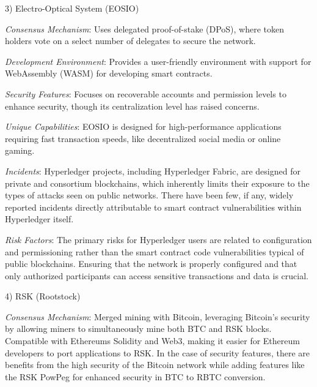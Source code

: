 \begin{multicols}{2}
3) Electro-Optical System (EOSIO)

\emph{Consensus Mechanism}: Uses delegated proof-of-stake (DPoS), where
token holders vote on a select number of delegates to secure the
network.

\emph{Development Environment}: Provides a user-friendly environment
with support for WebAssembly (WASM) for developing smart contracts.

\emph{Security Features}: Focuses on recoverable accounts and permission
levels to enhance security, though its centralization level has raised
concerns.

\emph{Unique Capabilities}: EOSIO is designed for high-performance
applications requiring fast transaction speeds, like decentralized
social media or online gaming.

\emph{Incidents}: Hyperledger projects, including Hyperledger Fabric,
are designed for private and consortium blockchains, which inherently
limits their exposure to the types of attacks seen on public networks.
There have been few, if any, widely reported incidents directly
attributable to smart contract vulnerabilities within Hyperledger
itself.

\emph{Risk Factors}: The primary risks for Hyperledger users are related
to configuration and permissioning rather than the smart contract code
vulnerabilities typical of public blockchains. Ensuring that the network
is properly configured and that only authorized participants can access
sensitive transactions and data is crucial.

4) RSK (Rootstock)

\emph{Consensus Mechanism}: Merged mining with Bitcoin, leveraging
Bitcoin's security by allowing miners to simultaneously mine both BTC
and RSK blocks. Compatible with Ethereum\textquotesingle s Solidity and
Web3, making it easier for Ethereum developers to port applications to
RSK. In the case of security features, there are benefits from the high
security of the Bitcoin network while adding features like the RSK
PowPeg for enhanced security in BTC to RBTC conversion.
\end{multicols}

